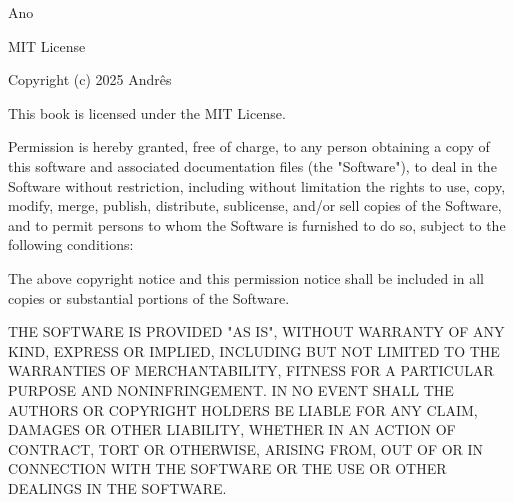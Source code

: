 \vfill

{\small
    Ano \editionyear

    \vspace{0.5cm}

    MIT License

    \vspace{0.5cm}

    Copyright (c) 2025 Andrês

    \vspace{0.5cm}

    This book is licensed under the MIT License. 

    \vspace{0.5cm}

    Permission is hereby granted, free of charge, to any person obtaining a copy
    of this software and associated documentation files (the "Software"), to deal
    in the Software without restriction, including without limitation the rights
    to use, copy, modify, merge, publish, distribute, sublicense, and/or sell
    copies of the Software, and to permit persons to whom the Software is
    furnished to do so, subject to the following conditions:

    \vspace{0.5cm}

    The above copyright notice and this permission notice shall be included in all
    copies or substantial portions of the Software.

    \vspace{0.5cm}

    THE SOFTWARE IS PROVIDED "AS IS", WITHOUT WARRANTY OF ANY KIND, EXPRESS OR
    IMPLIED, INCLUDING BUT NOT LIMITED TO THE WARRANTIES OF MERCHANTABILITY,
    FITNESS FOR A PARTICULAR PURPOSE AND NONINFRINGEMENT. IN NO EVENT SHALL THE
    AUTHORS OR COPYRIGHT HOLDERS BE LIABLE FOR ANY CLAIM, DAMAGES OR OTHER
    LIABILITY, WHETHER IN AN ACTION OF CONTRACT, TORT OR OTHERWISE, ARISING FROM,
    OUT OF OR IN CONNECTION WITH THE SOFTWARE OR THE USE OR OTHER DEALINGS IN THE
    SOFTWARE.
}
